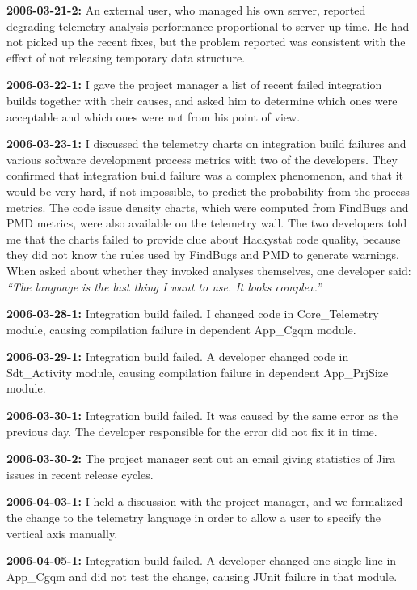 \textbf{2006-03-21-2:}
An external user, who managed his own server, reported degrading telemetry analysis performance proportional to server up-time. He had not picked up the recent fixes, but the problem reported was consistent with the effect of not releasing temporary data structure. 

\textbf{2006-03-22-1:} 
I gave the project manager a list of recent failed integration builds together with their causes, and asked him to determine which ones were acceptable and which ones were not from his point of view.

\textbf{2006-03-23-1:}
I discussed the telemetry charts on integration build failures and various software development process metrics with two of the developers. They confirmed that integration build failure was a complex phenomenon, and that it would be very hard, if not impossible, to predict the probability from the process metrics. 
The code issue density charts, which were computed from FindBugs and PMD metrics, were also available on the telemetry wall. The two developers told me that the charts failed to provide clue about Hackystat code quality, because they did not know the rules used by FindBugs and PMD to generate warnings.
When asked about whether they invoked analyses themselves, one developer said: \textit{``The language is the last thing I want to use. It looks complex.''}

\textbf{2006-03-28-1:}
Integration build failed. I changed code in Core\_Telemetry module, causing compilation failure in dependent App\_Cgqm module. 

\textbf{2006-03-29-1:}
Integration build failed. A developer changed code in Sdt\_Activity module, causing compilation failure in dependent App\_PrjSize module. 

\textbf{2006-03-30-1:}
Integration build failed. It was caused by the same error as the previous day. The developer responsible for the error did not fix it in time.

\textbf{2006-03-30-2:}
The project manager sent out an email giving statistics of Jira issues in recent release cycles.

\textbf{2006-04-03-1:}
I held a discussion with the project manager, and we formalized the change to the telemetry language in order to allow a user to specify the vertical axis manually.

\textbf{2006-04-05-1:}
Integration build failed. A developer changed one single line in App\_Cgqm and did not test the change, causing JUnit failure in that module.

